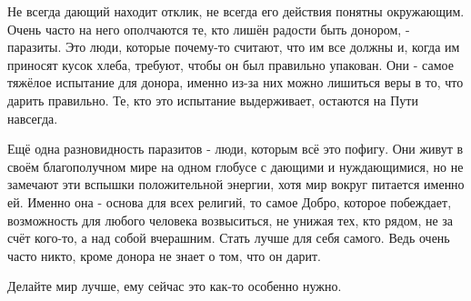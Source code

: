 Не всегда дающий находит отклик, не всегда его действия понятны окружающим.
Очень часто на него ополчаются те, кто лишён радости быть донором, - паразиты.
Это люди, которые почему-то считают, что им все должны и, когда им приносят
кусок хлеба, требуют, чтобы он был правильно упакован. Они - самое тяжёлое
испытание для донора, именно из-за них можно лишиться веры в то, что дарить
правильно. Те, кто это испытание выдерживает, остаются на Пути навсегда.

Ещё одна разновидность паразитов - люди, которым всё это пофигу. Они живут в
своём благополучном мире на одном глобусе с дающими и нуждающимися, но не
замечают эти вспышки положительной энергии, хотя мир вокруг питается именно ей.
Именно она - основа для всех религий, то самое Добро, которое побеждает,
возможность для любого человека возвыситься, не унижая тех, кто рядом, не за
счёт кого-то, а над собой вчерашним. Стать лучше для себя самого. Ведь очень
часто никто, кроме донора не знает о том, что он дарит.

Делайте мир лучше, ему сейчас это как-то особенно нужно.

